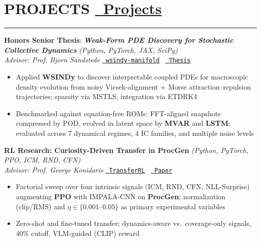 \documentclass[10.5pt]{article}
\begin{document}
\section*{\fontsize{11.5pt}{13pt}\selectfont\bfseries\MakeUppercase PROJECTS \hfill \normalsize \href{https://eugenio-macias.github.io/projects}{\faGlobe\ Projects}}
\vspace{2pt}
\hrule
\vspace{1pt}
\textbf{Honors Senior Thesis}: \textbf{\textit{Weak-Form PDE Discovery for Stochastic Collective Dynamics}} \textit{(Python, PyTorch, JAX, SciPy)} \\
\textit{Advisor: Prof. Bjorn Sandstede} \hfill \href{https://github.com/eugenio-macias/wsindy-manifold}{\faGithub\ \texttt{wsindy-manifold}} \textbar\ \href{https://eugenio-macias.github.io/Thesis.pdf}{\faFilePdf\ \texttt{Thesis}} \vspace{-7pt}
\begin{itemize}
  \item Applied \textbf{WSINDy} to discover interpretable coupled PDEs for macroscopic density evolution from noisy Vicsek-alignment + Morse attraction--repulsion trajectories; sparsity via MSTLS, integration via ETDRK4
  \item Benchmarked against equation-free ROMs: FFT-aligned snapshots compressed by POD, evolved in latent space by \textbf{MVAR} and \textbf{LSTM}; evaluated across 7 dynamical regimes, 4 IC families, and multiple noise levels
\end{itemize}
\textbf{RL Research: Curiosity-Driven Transfer in ProcGen} \textit{(Python, PyTorch, PPO, ICM, RND, CFN)} \\
\textit{Advisor: Prof. George Konidaris} \hfill \href{https://github.com/harshitaggarwal01/TransferRL}{\faGithub\ \texttt{TransferRL}} \textbar\ \href{https://eugenio-macias.github.io/Reintegrating_AI_Course__Curiosity_Driven_Transfer_Learning___Final_Paper.pdf}{\faFilePdf\ \texttt{Paper}} \vspace{-7pt}
\begin{itemize}
  \item Factorial sweep over four intrinsic signals (ICM, RND, CFN, NLL-Surprise) augmenting \textbf{PPO} with IMPALA-CNN on \textbf{ProcGen}; normalization (clip/RMS) and $\eta \in \{0.001\text{--}0.05\}$ as primary experimental variables
  \item Zero-shot and fine-tuned transfer; dynamics-aware vs.\ coverage-only signals, 40\% cutoff, VLM-guided (CLIP) reward
\end{itemize}
\end{document}
